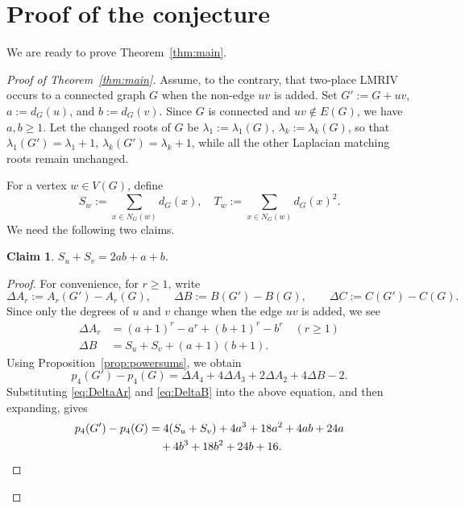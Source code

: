 \documentclass[11pt]{amsart}
\numberwithin{equation}{section}
\newtheorem{claim}{Claim}
\begin{document}
\section{Proof of the conjecture}

We are ready to prove Theorem~\ref{thm:main}.

\begin{proof}[Proof of Theorem~\ref{thm:main}]
Assume, to the contrary, that two-place LMRIV occurs to a connected graph $G$ when the non-edge $uv$ is added. Set $G':=G+uv$, $a:=d_G(u)$, and $b:=d_G(v)$.
Since $G$ is connected and $uv\notin E(G)$, we have $a,b\ge 1$. Let the changed roots of $G$ be $\lambda_1:=\lambda_1(G)$, $\lambda_k:=\lambda_k(G)$, so that
$\lambda_1(G')=\lambda_1+1$, $\lambda_k(G')=\lambda_k+1$,
while all the other Laplacian matching roots remain unchanged.

For a vertex $w\in V(G)$, define
\[
S_w:=\sum_{x\in N_G(w)} d_G(x), \quad 
T_w:=\sum_{x\in N_G(w)} d_G(x)^2.
\]
We need the following two claims.

\begin{claim}\label{claim-1}
$S_u+S_v=2ab+a+b$.
\end{claim}

\begin{proof}
For convenience, for $r\geq 1$, write 
\[
\Delta A_r :=A_r(G')-A_r(G),\qquad 
\Delta B :=B(G')-B(G), \qquad
\Delta C :=C(G')-C(G).
\]
Since only the degrees of $u$ and $v$ change when the edge $uv$ is added, we see
\begin{align}\label{eq:DeltaAr}
\Delta A_r & =(a+1)^r-a^r+(b+1)^r-b^r \quad (r\ge 1) \\
\Delta B & = S_u+S_v+(a+1)(b+1). \label{eq:DeltaB}
\end{align}
Using Proposition~\ref{prop:powersums}, we obtain
\[
p_4(G')-p_4(G)=\Delta A_4+4\Delta A_3+2\Delta A_2+4\Delta B-2.
\]
Substituting \eqref{eq:DeltaAr} and \eqref{eq:DeltaB} into the above equation, and then expanding, gives
\begin{align}
p_4(G')-p_4(G)
& = 4(S_u+S_v)+4a^3+18a^2+4ab+24a \notag \\
&\quad +4b^3+18b^2+24b+16.
\label{eq:delta-p4-comb-expanded}
\end{align}


\end{proof}
\end{proof}
\end{document}
